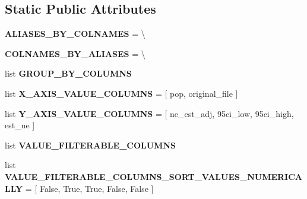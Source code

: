 \subsection*{Static Public Attributes}
\begin{DoxyCompactItemize}
\item 
{\bfseries A\+L\+I\+A\+S\+E\+S\+\_\+\+B\+Y\+\_\+\+C\+O\+L\+N\+A\+M\+ES} = \textbackslash{}\hypertarget{classnegui_1_1pgneestimationregressplotinterface_1_1PGNeEstimationRegressplotInterface_ae4ba89559d0d3c4c5cd4d86658e3e1d8}{}\label{classnegui_1_1pgneestimationregressplotinterface_1_1PGNeEstimationRegressplotInterface_ae4ba89559d0d3c4c5cd4d86658e3e1d8}

\item 
{\bfseries C\+O\+L\+N\+A\+M\+E\+S\+\_\+\+B\+Y\+\_\+\+A\+L\+I\+A\+S\+ES} = \textbackslash{}\hypertarget{classnegui_1_1pgneestimationregressplotinterface_1_1PGNeEstimationRegressplotInterface_a717951492e49e83af2b1adddedd25899}{}\label{classnegui_1_1pgneestimationregressplotinterface_1_1PGNeEstimationRegressplotInterface_a717951492e49e83af2b1adddedd25899}

\item 
list {\bfseries G\+R\+O\+U\+P\+\_\+\+B\+Y\+\_\+\+C\+O\+L\+U\+M\+NS}
\item 
list {\bfseries X\+\_\+\+A\+X\+I\+S\+\_\+\+V\+A\+L\+U\+E\+\_\+\+C\+O\+L\+U\+M\+NS} = \mbox{[} \textquotesingle{}pop\textquotesingle{}, \textquotesingle{}original\+\_\+file\textquotesingle{} \mbox{]}\hypertarget{classnegui_1_1pgneestimationregressplotinterface_1_1PGNeEstimationRegressplotInterface_a87f062a2e8e03f1b172b52294f9d670c}{}\label{classnegui_1_1pgneestimationregressplotinterface_1_1PGNeEstimationRegressplotInterface_a87f062a2e8e03f1b172b52294f9d670c}

\item 
list {\bfseries Y\+\_\+\+A\+X\+I\+S\+\_\+\+V\+A\+L\+U\+E\+\_\+\+C\+O\+L\+U\+M\+NS} = \mbox{[} \textquotesingle{}ne\+\_\+est\+\_\+adj\textquotesingle{}, \textquotesingle{}95ci\+\_\+low\textquotesingle{}, \textquotesingle{}95ci\+\_\+high\textquotesingle{}, \textquotesingle{}est\+\_\+ne\textquotesingle{} \mbox{]}\hypertarget{classnegui_1_1pgneestimationregressplotinterface_1_1PGNeEstimationRegressplotInterface_abf985daefd4a324f4083a69923851a4c}{}\label{classnegui_1_1pgneestimationregressplotinterface_1_1PGNeEstimationRegressplotInterface_abf985daefd4a324f4083a69923851a4c}

\item 
list {\bfseries V\+A\+L\+U\+E\+\_\+\+F\+I\+L\+T\+E\+R\+A\+B\+L\+E\+\_\+\+C\+O\+L\+U\+M\+NS}
\item 
list {\bfseries V\+A\+L\+U\+E\+\_\+\+F\+I\+L\+T\+E\+R\+A\+B\+L\+E\+\_\+\+C\+O\+L\+U\+M\+N\+S\+\_\+\+S\+O\+R\+T\+\_\+\+V\+A\+L\+U\+E\+S\+\_\+\+N\+U\+M\+E\+R\+I\+C\+A\+L\+LY} = \mbox{[} False, True, True, False, False \mbox{]}\hypertarget{classnegui_1_1pgneestimationregressplotinterface_1_1PGNeEstimationRegressplotInterface_aaba7fa909400c32990adee7a9bda6915}{}\label{classnegui_1_1pgneestimationregressplotinterface_1_1PGNeEstimationRegressplotInterface_aaba7fa909400c32990adee7a9bda6915}


\end{DoxyCompactItemize}
